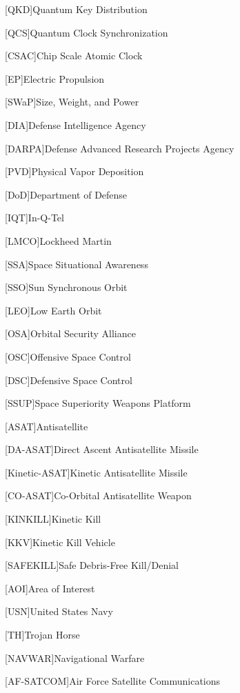 [QKD]{Quantum Key Distribution}

[QCS]{Quantum Clock Synchronization}

[CSAC]{Chip Scale Atomic Clock}

[EP]{Electric Propulsion}

[SWaP]{Size, Weight, and Power}

[DIA]{Defense Intelligence Agency}

[DARPA]{Defense Advanced Research Projects Agency}

[PVD]{Physical Vapor Deposition}

[DoD]{Department of Defense}

[IQT]{In-Q-Tel}

[LMCO]{Lockheed Martin}

[SSA]{Space Situational Awareness}

[SSO]{Sun Synchronous Orbit}

[LEO]{Low Earth Orbit}

[OSA]{Orbital Security Alliance}

[OSC]{Offensive Space Control}

[DSC]{Defensive Space Control}

[SSUP]{Space Superiority Weapons Platform}

[ASAT]{Antisatellite}

[DA-ASAT]{Direct Ascent Antisatellite Missile}

[Kinetic-ASAT]{Kinetic Antisatellite Missile}

[CO-ASAT]{Co-Orbital Antisatellite Weapon}

[KINKILL]{Kinetic Kill}

[KKV]{Kinetic Kill Vehicle}

[SAFEKILL]{Safe Debris-Free Kill/Denial}

[AOI]{Area of Interest}

[USN]{United States Navy}

[TH]{Trojan Horse}

[NAVWAR]{Navigational Warfare}

[AF-SATCOM]{Air Force Satellite Communications}

